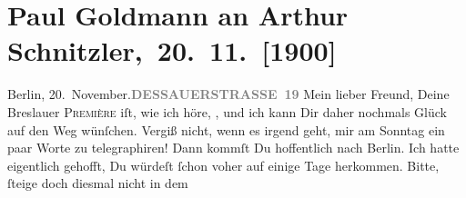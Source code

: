 

         
         \renewcommand{\erwaehntePersonen}{Personen: Richard Beer-Hofmann, Paul Goldmann}
         \renewcommand{\erwaehnteOrte}{Orte: Berlin, Breslau, Dessauer Straße, Hotel Continental (Berlin), Palasthotel Berlin, Wien}
         \renewcommand{\erwaehnteWerke}{Werke: Der Schleier der Beatrice. Schauspiel in fünf Akten}
               \section[ Paul Goldmann an Arthur Schnitzler, 20. 11. {[}1900{]}]{ Paul Goldmann an Arthur Schnitzler, 20. 11. {[}1900{]}}\nopagebreak{}\rehead{ }\begin{ledgroupsized}[t]{13cm}\normalsize\beginnumbering{} \toendnotes[C]{\smallbreak\pagebreak[2]} 
\toendnotes[C]{\smallbreak}\pstart
           \noindent{}{\pb}Berlin, 20. November.\hfill \textcolor{gray}{\textbf{DESSAUERSTRASSE 19}}\pend
           \pstart{}Mein lieber Freund,\pend\pstart
           Deine Breslauer \textsc{Première} iſt, wie ich höre, \label{K_L02939-1v}\label{K_L02939-1h}, und ich kann Dir daher nochmals Glück auf den Weg wünſchen. Vergiß nicht,
               wenn es irgend geht, mir am Sonntag ein paar Worte zu
               telegraphiren! Dann kommſt Du hoffentlich nach Berlin. Ich hatte eigentlich gehofft, Du würdeſt ſchon voher auf einige Tage
               herkommen. Bitte, ſteige {\pb}doch diesmal nicht in dem

\end{ledgroupsized}
